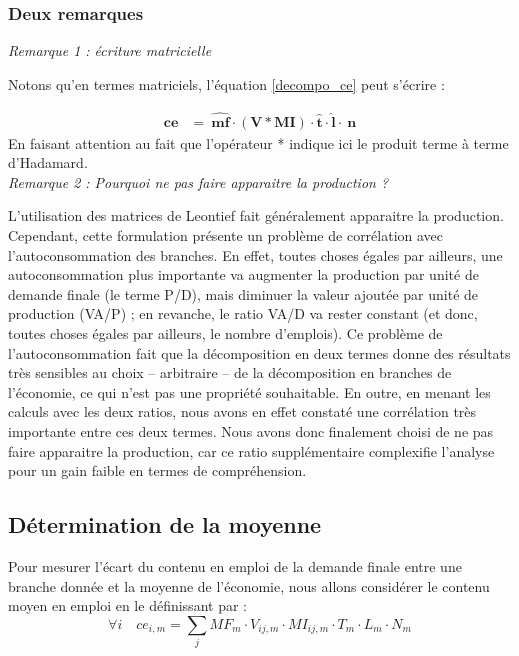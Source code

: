 \subsubsection{Deux remarques}

\emph{Remarque 1 : écriture matricielle}

Notons qu'en termes matriciels, l'équation \ref{decompo_ce} peut s'écrire : 

\begin{align*}
\pmb{ce} &=~\widehat{\pmb{mf}} \cdot \left( \pmb{V}  * \pmb{MI} \right) \cdot \widehat{ \pmb{t}} \cdot \widehat{\pmb{l}} \cdot~\pmb{n}  
\end{align*}
En faisant attention au fait que l'opérateur * indique ici le produit terme à terme d'Hadamard.\\

\emph{Remarque 2 : Pourquoi ne pas faire apparaitre la production ?}

L’utilisation des matrices de Leontief fait généralement apparaitre la production. 
Cependant, cette formulation présente un problème de corrélation avec l’autoconsommation des branches. 
En effet, toutes choses égales par ailleurs, une autoconsommation plus importante va augmenter la production par unité de demande finale (le terme P/D), mais diminuer la valeur ajoutée par unité de production (VA/P) ; en revanche, le ratio VA/D va rester constant (et donc, toutes choses égales par ailleurs, le nombre d’emplois). 
Ce problème de l’autoconsommation fait que la décomposition en deux termes donne des résultats très sensibles au choix – arbitraire – de la décomposition en branches de l’économie, ce qui n’est pas une propriété souhaitable. 
En outre, en menant les calculs avec les deux ratios, nous avons en effet constaté une corrélation très importante entre ces deux termes. 
Nous avons donc finalement choisi de ne pas faire apparaitre la production, car ce ratio supplémentaire complexifie l’analyse pour un gain faible en termes de compréhension.


\clearpage
\subsection{Détermination de la moyenne}
\label{app:def_moyenne}

Pour mesurer l’écart du contenu en emploi de la demande finale entre une branche donnée et la moyenne de l’économie, nous allons considérer le contenu moyen en emploi en le définissant par :
\begin{equation}
\forall i \quad ce_{i,m} = \sum_j MF_m \cdot V_{ij,m} \cdot MI_{ij,m} \cdot T_m \cdot L_m \cdot N_m
\end{equation}


